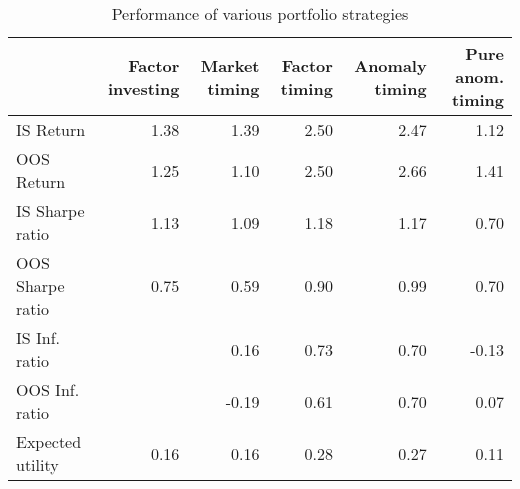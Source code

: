 \begin{table}
\caption{Performance of various portfolio strategies}
\begin{tabular}{lrrrrr}
\toprule
 & Factor investing & Market timing & Factor timing & Anomaly timing & Pure anom. timing \\
\midrule
IS Return & 1.38 & 1.39 & 2.50 & 2.47 & 1.12 \\
OOS Return & 1.25 & 1.10 & 2.50 & 2.66 & 1.41 \\
IS Sharpe ratio & 1.13 & 1.09 & 1.18 & 1.17 & 0.70 \\
OOS Sharpe ratio & 0.75 & 0.59 & 0.90 & 0.99 & 0.70 \\
IS Inf. ratio &  & 0.16 & 0.73 & 0.70 & -0.13 \\
OOS Inf. ratio &  & -0.19 & 0.61 & 0.70 & 0.07 \\
Expected utility & 0.16 & 0.16 & 0.28 & 0.27 & 0.11 \\
\bottomrule
\end{tabular}
\end{table}
